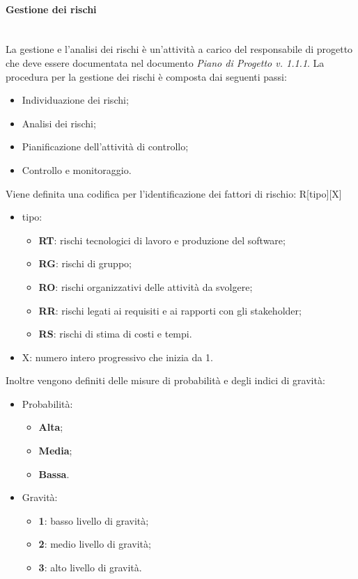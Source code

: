 			\paragraph{Gestione dei rischi}\mbox{}\\ [1mm]
				La gestione e l'analisi dei rischi è un'attività a carico del responsabile di progetto che deve essere documentata nel documento \textit{Piano di Progetto v. 1.1.1}.
				La procedura per la gestione dei rischi è composta dai seguenti passi:
				\begin{itemize}
					\item Individuazione dei rischi;
					\item Analisi dei rischi;
					\item Pianificazione dell'attività di controllo;
					\item Controllo e monitoraggio.
				\end{itemize}
				Viene definita una codifica per l'identificazione dei fattori di rischio: R[tipo][X]
				\begin{itemize}
					\item tipo:
					\begin{itemize}
						\item \textbf{RT}: rischi tecnologici di lavoro e produzione del software;
						\item \textbf{RG}: rischi di gruppo;
						\item \textbf{RO}: rischi organizzativi delle attività da svolgere;
						\item \textbf{RR}: rischi legati ai requisiti e ai rapporti con gli stakeholder\glo;
						\item \textbf{RS}: rischi di stima di costi e tempi.
					\end{itemize}
					\item X: numero intero progressivo che inizia da 1.
				\end{itemize}
				Inoltre vengono definiti delle misure di probabilità e degli indici di gravità:
				\begin{itemize}
					\item Probabilità:
					\begin{itemize}
						\item \textbf{Alta};
						\item \textbf{Media};
						\item \textbf{Bassa}.
					\end{itemize}
					\item Gravità:
					\begin{itemize}
						\item \textbf{1}: basso livello di gravità;
						\item \textbf{2}: medio livello di gravità;
						\item \textbf{3}: alto livello di gravità.
					\end{itemize}
				\end{itemize}
